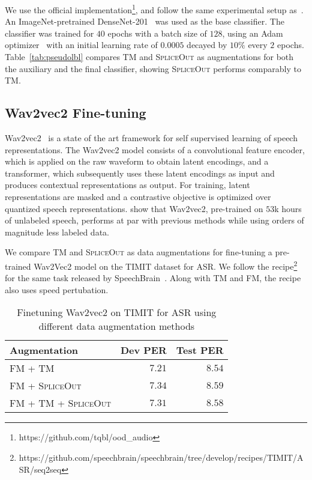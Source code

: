 \documentclass{article}
\newcommand{\SpA}{{\textsc{SpliceOut}}\xspace}
\begin{document}
We use the official implementation\footnote{https://github.com/tqbl/ood\_audio}, and follow the same experimental setup as~\citep{ood}. An ImageNet-pretrained DenseNet-201~\citep{huang2017densely} was used as the base classifier. The classifier was trained for $40$ epochs with a batch size of $128$, using an Adam optimizer~\citep{adam} with an initial learning rate of $0.0005$ decayed by $10\%$ every $2$ epochs. Table~\ref{tab:pseudolbl} compares TM and \SpA as augmentations for both the auxiliary and the final classifier, showing \SpA  performs comparably to TM. 



\subsection{Wav2vec2 Fine-tuning}
Wav2vec2~\citep{wav2vec2} is a state of the art framework for self supervised learning of speech representations. The Wav2vec2 model consists of a convolutional feature encoder, which is applied on the raw waveform to obtain latent encodings, and a transformer, which subsequently uses these latent encodings as input and produces contextual representations as output. For training, latent representations are masked and a contrastive objective is optimized over quantized speech
representations. \citep{wav2vec2} show that Wav2vec2, pre-trained on $53$k hours of unlabeled speech, performs at par with previous methods while using orders of magnitude less labeled data. 

We compare TM and \SpA as data augmentations for fine-tuning a pre-trained Wav2Vec2 model on the TIMIT dataset for ASR. We follow the recipe\footnote{https://github.com/speechbrain/speechbrain/tree/develop/recipes/TIMIT/ASR/seq2seq} for the same task released by SpeechBrain~\citep{speechbrain}. Along with TM and FM, the recipe also uses speed pertubation. 

\begin{table}[h]
    \centering
    \caption{Finetuning Wav2vec2 on TIMIT for ASR using different data augmentation methods}
    \begin{tabular}{lrr}
    \toprule
         Augmentation & Dev PER & Test PER\\
         \midrule
         FM + TM~\citep{speechbrain} & $7.21$ & $8.54$\\
         FM + \SpA & $7.34$ & $8.59$\\
         FM + TM + \SpA & $7.31$ & $8.58$\\
    \bottomrule
    \end{tabular}
    \label{tab:timit}
\end{table}
\end{document}
